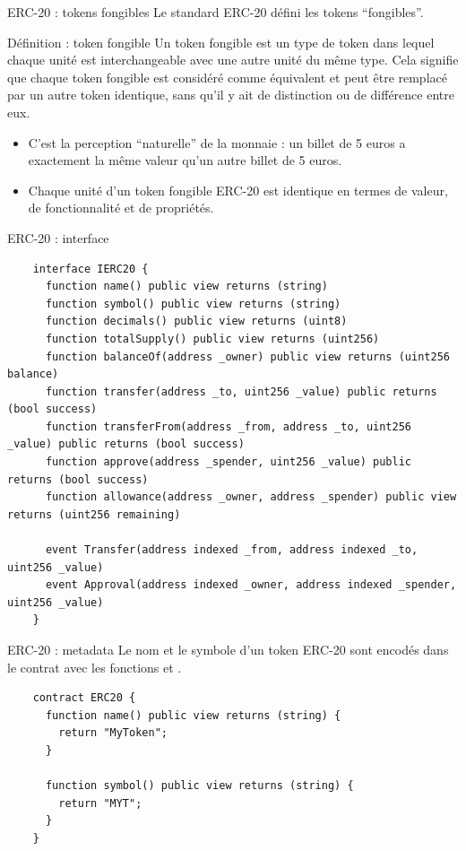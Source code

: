 \begin{frame}{ERC-20 : tokens fongibles}
  Le standard ERC-20 défini les tokens \enquote{fongibles}.

  \begin{block}{Définition : token fongible}
    Un token fongible est un type de token dans lequel chaque unité est interchangeable avec une autre unité du même type.
    Cela signifie que chaque token fongible est considéré comme équivalent et peut être remplacé par un autre token identique, sans qu'il y ait de distinction ou de différence entre eux.
  \end{block}

  \begin{itemize}
    \item C'est la perception \enquote{naturelle} de la monnaie : un billet de 5 euros a exactement la même valeur qu'un autre billet de 5 euros.
    \item Chaque unité d'un token fongible ERC-20 est identique en termes de valeur, de fonctionnalité et de propriétés.
  \end{itemize}
\end{frame}

\begin{frame}[fragile]{ERC-20 : interface}
  \begin{verbatim}
    interface IERC20 {
      function name() public view returns (string)
      function symbol() public view returns (string)
      function decimals() public view returns (uint8)
      function totalSupply() public view returns (uint256)
      function balanceOf(address _owner) public view returns (uint256 balance)
      function transfer(address _to, uint256 _value) public returns (bool success)
      function transferFrom(address _from, address _to, uint256 _value) public returns (bool success)
      function approve(address _spender, uint256 _value) public returns (bool success)
      function allowance(address _owner, address _spender) public view returns (uint256 remaining)

      event Transfer(address indexed _from, address indexed _to, uint256 _value)
      event Approval(address indexed _owner, address indexed _spender, uint256 _value)
    }
  \end{verbatim}
\end{frame}

\begin{frame}[fragile]{ERC-20 : metadata}
  Le nom et le symbole d'un token ERC-20 sont encodés dans le contrat avec les fonctions  et .

  \begin{verbatim}
    contract ERC20 {
      function name() public view returns (string) {
        return "MyToken";
      }

      function symbol() public view returns (string) {
        return "MYT";
      }
    }
  \end{verbatim}
\end{frame}

